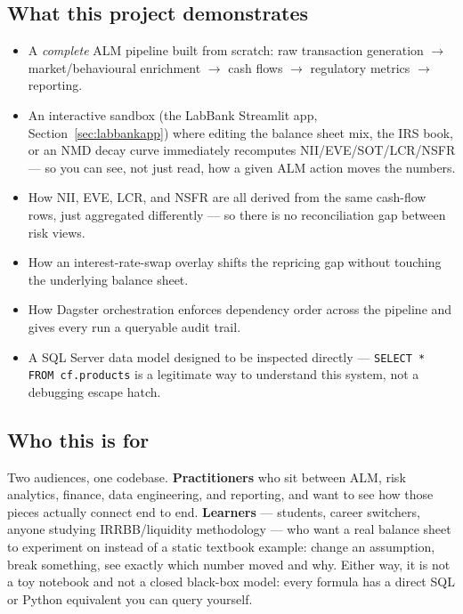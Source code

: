 \documentclass[11pt,a4paper]{article}
\begin{document}
\subsection{What this project demonstrates}
\begin{itemize}[itemsep=2pt]
  \item A \textit{complete} ALM pipeline built from scratch: raw transaction
        generation $\rightarrow$ market/behavioural enrichment $\rightarrow$
        cash flows $\rightarrow$ regulatory metrics $\rightarrow$ reporting.
  \item An interactive sandbox (the LabBank Streamlit app,
        Section~\ref{sec:labbankapp}) where
        editing the balance sheet mix, the IRS book, or an NMD decay curve
        immediately recomputes NII/EVE/SOT/LCR/NSFR --- so you can see, not
        just read, how a given ALM action moves the numbers.
  \item How NII, EVE, LCR, and NSFR are all derived from the same cash-flow
        rows, just aggregated differently --- so there is no reconciliation gap
        between risk views.
  \item How an interest-rate-swap overlay shifts the repricing gap without
        touching the underlying balance sheet.
  \item How Dagster orchestration enforces dependency order across the pipeline
        and gives every run a queryable audit trail.
  \item A SQL Server data model designed to be inspected directly ---
        \texttt{SELECT * FROM cf.products} is a legitimate way to understand
        this system, not a debugging escape hatch.
\end{itemize}

\subsection{Who this is for}
Two audiences, one codebase. \textbf{Practitioners} who sit between ALM, risk
analytics, finance, data engineering, and reporting, and want to see how those
pieces actually connect end to end. \textbf{Learners} --- students, career
switchers, anyone studying IRRBB/liquidity methodology --- who want a real
balance sheet to experiment on instead of a static textbook example: change an
assumption, break something, see exactly which number moved and why. Either
way, it is not a toy notebook and not a closed black-box model: every formula
has a direct SQL or Python equivalent you can query yourself.
\end{document}
